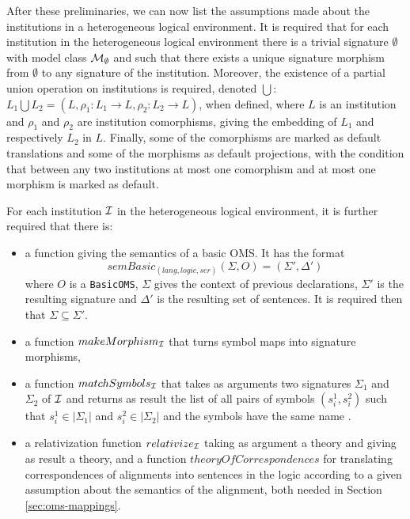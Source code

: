 \documentclass[10pt,fleqn,final]{scrreprt}
\newcommand*{\syntax}[1]{\texttt{#1}}
\newenvironment{definitions}[0]{\medskip }{}
\begin{document}
\begin{definitions}
After these preliminaries, we can now list the assumptions made about the
institutions in a heterogeneous logical environment.
It is required that for each institution in the heterogeneous logical environment there is a trivial signature
$\emptyset$ with model class ${\cal M}_\emptyset$ and such that there exists a unique signature morphism
from $\emptyset$ to any signature of the institution. Moreover, the existence of a partial union operation on institutions is required, denoted $\bigcup$: 
$L_1 \bigcup L_2 = (L, \rho_1:L_1 \to L, \rho_2 : L_2 \to L)$, when defined, where
$L$ is an institution and $\rho_1$ and
$\rho_2$ are institution comorphisms, giving the embedding of $L_1$ and
respectively $L_2$ in $L$. Finally, some of the comorphisms are marked as default translations and some of the morphisms as default projections, with the condition that between any two institutions at most one comorphism and at most one morphism is marked as default.

For each institution ${\cal I}$ in the heterogeneous logical environment, it is further required that there is:

\begin{itemize}
  \item  a function giving the semantics of a basic OMS. It has the format
$$\mathit{semBasic}_{(lang,logic,ser)}(\Sigma,O) = (\Sigma',\Delta')$$
where $O$ is a \syntax{BasicOMS}, $\Sigma$ gives the context of previous declarations, $\Sigma'$ is the resulting
signature and $\Delta'$ is the resulting set of sentences.
 It is required then that $\Sigma\subseteq\Sigma'$.
  \item a function $makeMorphism_{\cal I}$ that turns symbol maps into signature morphisms,
  \item a function $matchSymbols_{\cal I}$ that takes as arguments two signatures 
  $\Sigma_1$ and $\Sigma_2$ of ${\cal I}$
  and returns as result the list of all pairs of symbols $(s^1_i,s^2_i)$ such that
  $s^1_i\in|\Sigma_1|$ and $s^2_i\in|\Sigma_2|$ and the symbols have the same name
  .
  \item a relativization function $relativize_{\cal I}$ 
  taking as argument a theory and giving as 
  result a theory, and a function
  $theoryOfCorrespondences$ for translating correspondences of alignments
  into sentences in the logic according to a given assumption about the
  semantics of the alignment, both needed in Section \ref{sec:oms-mappings}.
\end{itemize}


\end{definitions}
\end{document}
